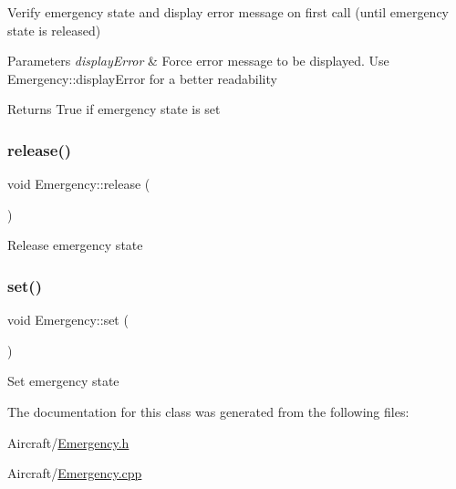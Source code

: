 Verify emergency state and display error message on first call (until emergency state is released) 
\begin{DoxyParams}{Parameters}
{\em display\+Error} & Force error message to be displayed. Use Emergency\+::display\+Error for a better readability \\
\hline
\end{DoxyParams}
\begin{DoxyReturn}{Returns}
True if emergency state is set 
\end{DoxyReturn}
\mbox{\label{class_m210_1_1_emergency_a44add09d4d5016a54ffb714e468a40ac}} 
\subsubsection{\texorpdfstring{release()}{release()}}
{\footnotesize\ttfamily void Emergency\+::release (\begin{DoxyParamCaption}{ }\end{DoxyParamCaption})}

Release emergency state \mbox{\label{class_m210_1_1_emergency_aa461736b60192940860a5f71839049b5}} 
\subsubsection{\texorpdfstring{set()}{set()}}
{\footnotesize\ttfamily void Emergency\+::set (\begin{DoxyParamCaption}{ }\end{DoxyParamCaption})}

Set emergency state 

The documentation for this class was generated from the following files\+:\begin{DoxyCompactItemize}
\item 
Aircraft/\mbox{\hyperlink{_emergency_8h}{Emergency.\+h}}\item 
Aircraft/\mbox{\hyperlink{_emergency_8cpp}{Emergency.\+cpp}}\end{DoxyCompactItemize}
